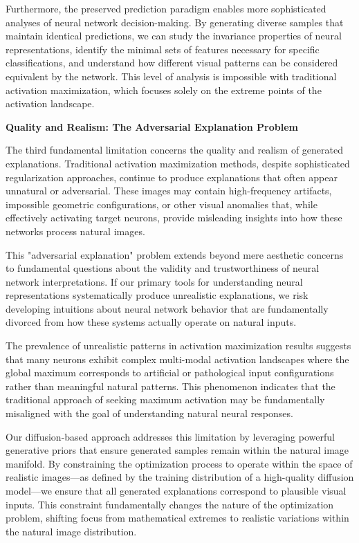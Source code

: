 Furthermore, the preserved prediction paradigm enables more sophisticated analyses of neural network decision-making. By generating diverse samples that maintain identical predictions, we can study the invariance properties of neural representations, identify the minimal sets of features necessary for specific classifications, and understand how different visual patterns can be considered equivalent by the network. This level of analysis is impossible with traditional activation maximization, which focuses solely on the extreme points of the activation landscape.

\textbf{Quality and Realism: The Adversarial Explanation Problem}

The third fundamental limitation concerns the quality and realism of generated explanations. Traditional activation maximization methods, despite sophisticated regularization approaches, continue to produce explanations that often appear unnatural or adversarial. These images may contain high-frequency artifacts, impossible geometric configurations, or other visual anomalies that, while effectively activating target neurons, provide misleading insights into how these networks process natural images.

This "adversarial explanation" problem extends beyond mere aesthetic concerns to fundamental questions about the validity and trustworthiness of neural network interpretations. If our primary tools for understanding neural representations systematically produce unrealistic explanations, we risk developing intuitions about neural network behavior that are fundamentally divorced from how these systems actually operate on natural inputs.

The prevalence of unrealistic patterns in activation maximization results suggests that many neurons exhibit complex multi-modal activation landscapes where the global maximum corresponds to artificial or pathological input configurations rather than meaningful natural patterns. This phenomenon indicates that the traditional approach of seeking maximum activation may be fundamentally misaligned with the goal of understanding natural neural responses.

Our diffusion-based approach addresses this limitation by leveraging powerful generative priors that ensure generated samples remain within the natural image manifold. By constraining the optimization process to operate within the space of realistic images—as defined by the training distribution of a high-quality diffusion model—we ensure that all generated explanations correspond to plausible visual inputs. This constraint fundamentally changes the nature of the optimization problem, shifting focus from mathematical extremes to realistic variations within the natural image distribution.

